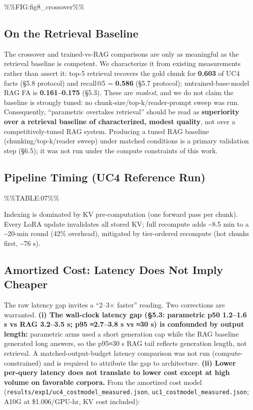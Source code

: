 \%\%FIG:fig8\_crossover\%\%

\hypertarget{on-the-retrieval-baseline}{%
\subsection{On the Retrieval Baseline}\label{on-the-retrieval-baseline}}

The crossover and trained-vs-RAG comparisons are only as meaningful as the retrieval baseline is competent. We characterize it from existing measurements rather than assert it: top-5 retrieval recovers the gold chunk for \textbf{0.603} of UC4 facts (§5.8 protocol) and recall@5 = \textbf{0.586} (§5.7 protocol); untrained-base-model RAG FA is \textbf{0.161--0.175} (§5.3). These are \emph{modest}, and we do not claim the baseline is strongly tuned: no chunk-size/top-k/reader-prompt sweep was run. Consequently, ``parametric overtakes retrieval'' should be read as \textbf{superiority over a retrieval baseline of characterized, modest quality}, not over a competitively-tuned RAG system. Producing a tuned RAG baseline (chunking/top-k/reader sweep) under matched conditions is a primary validation step (§6.5); it was not run under the compute constraints of this work.

\hypertarget{pipeline-timing-uc4-reference-run}{%
\subsection{Pipeline Timing (UC4 Reference Run)}\label{pipeline-timing-uc4-reference-run}}

\%\%TABLE:07\%\%

Indexing is dominated by KV pre-computation (one forward pass per chunk). Every LoRA update invalidates all stored KV; full recompute adds \textasciitilde8.5 min to a \textasciitilde20-min round (42\% overhead), mitigated by tier-ordered recompute (hot chunks first, \textasciitilde76 s).

\hypertarget{amortized-cost-latency-does-not-imply-cheaper}{%
\subsection{Amortized Cost: Latency Does Not Imply Cheaper}\label{amortized-cost-latency-does-not-imply-cheaper}}

The raw latency gap invites a ``2--3× faster'' reading. Two corrections are warranted. \textbf{(i) The wall-clock latency gap (§5.3: parametric p50 1.2--1.6 s vs RAG 3.2--3.5 s; p95 ≈2.7--3.8 s vs ≈30 s) is confounded by output length:} parametric arms used a short generation cap while the RAG baseline generated long answers, so the p95≈30 s RAG tail reflects generation length, not retrieval. A matched-output-budget latency comparison was not run (compute-constrained) and is required to attribute the gap to architecture. \textbf{(ii) Lower per-query latency does not translate to lower cost except at high volume on favorable corpora.} From the amortized cost model (\texttt{results/exp1/uc4\_costmodel\_measured.json}, \texttt{uc1\_costmodel\_measured.json}; A10G at \$1.006/GPU-hr, KV cost included):

